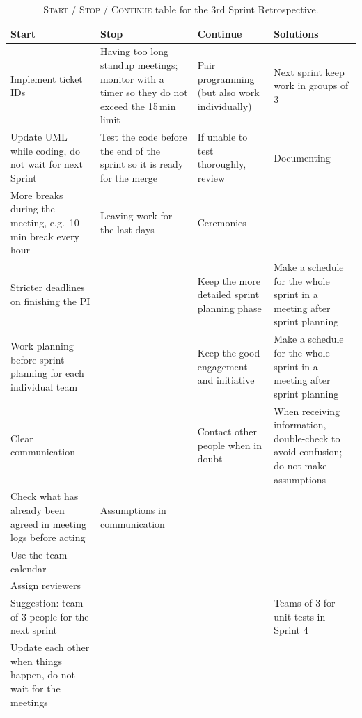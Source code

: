 \begin{table}[htbp]
    \centering
    \caption{\textsc{Start} / \textsc{Stop} / \textsc{Continue} table for the 3rd Sprint Retrospective.}
    \label{tab:sprint3-retro}
    \small
    \renewcommand{\arraystretch}{1.25}
    \begin{tabular}{@{}p{} p{} p{} p{}@{}}
        \toprule
        \textbf{Start} & \textbf{Stop} & \textbf{Continue} & \textbf{Solutions} \\
        \midrule
        Implement ticket IDs &
        Having too long standup meetings; monitor with a timer so they do not exceed the 15\,min limit &
        Pair programming (but also work individually) &
        Next sprint keep work in groups of 3 \\

        Update UML while coding, do not wait for next Sprint &
        Test the code before the end of the sprint so it is ready for the merge &
        If unable to test thoroughly, review &
        Documenting \\

        More breaks during the meeting, e.g.\ 10\,min break every hour &
        Leaving work for the last days &
        Ceremonies &
        \\

        Stricter deadlines on finishing the PI &
        &
        Keep the more detailed sprint planning phase &
        Make a schedule for the whole sprint in a meeting after sprint planning \\

        Work planning before sprint planning for each individual team &
        &
        Keep the good engagement and initiative &
        Make a schedule for the whole sprint in a meeting after sprint planning \\

        Clear communication &
        &
        Contact other people when in doubt &
        When receiving information, double-check to avoid confusion; do not make assumptions \\

        Check what has already been agreed in meeting logs before acting &
        Assumptions in communication &
        &
        \\

        Use the team calendar &
        &
        &
        \\

        Assign reviewers &
        &
        &
        \\

        Suggestion: team of 3 people for the next sprint &
        &
        &
        Teams of 3 for unit tests in Sprint 4 \\

        Update each other when things happen, do not wait for the meetings &
        &
        &
        \\
        \bottomrule
    \end{tabular}
\end{table}
\newpage

